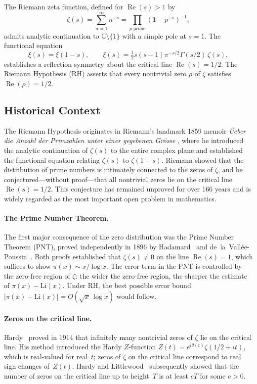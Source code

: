 \documentclass[11pt]{article}
\theoremstyle{remark}
\DeclareMathOperator{\Rea}{Re}
\begin{document}
The Riemann zeta function, defined for $\Rea(s)>1$ by
\begin{equation}\label{eq:zeta-def}
  \zeta(s) = \sum_{n=1}^{\infty} n^{-s} = \prod_{p\;\mathrm{prime}} (1-p^{-s})^{-1},
\end{equation}
admits analytic continuation to $\mathbb{C}\setminus\{1\}$ with a simple pole at $s=1$.
The functional equation
\begin{equation}\label{eq:func-eq}
  \xi(s) = \xi(1-s), \qquad \xi(s) = \tfrac{1}{2}s(s-1)\pi^{-s/2}\Gamma(s/2)\,\zeta(s),
\end{equation}
establishes a reflection symmetry about the critical line $\Rea(s)=1/2$.
The Riemann Hypothesis (RH) asserts that every nontrivial zero $\rho$ of $\zeta$
satisfies $\Rea(\rho)=1/2$.

\subsection{Historical Context}

The Riemann Hypothesis originates in Riemann's landmark 1859 memoir
\emph{\"Ueber die Anzahl der Primzahlen unter einer gegebenen Gr\"osse}
\cite{Riemann1859}, where he introduced the analytic continuation of $\zeta(s)$
to the entire complex plane and established the functional equation relating
$\zeta(s)$ to $\zeta(1-s)$.
Riemann showed that the distribution of prime numbers is intimately connected to the
zeros of $\zeta$, and he conjectured---without proof---that all nontrivial zeros
lie on the critical line $\Rea(s)=1/2$.
This conjecture has remained unproved for over 166 years and is widely regarded as
the most important open problem in mathematics.

\paragraph{The Prime Number Theorem.}
The first major consequence of the zero distribution was the Prime Number Theorem
(PNT), proved independently in 1896 by Hadamard~\cite{Hadamard} and
de~la~Vall\'ee-Poussin~\cite{dlVP}.
Both proofs established that $\zeta(s)\neq 0$ on the line $\Rea(s)=1$, which
suffices to show $\pi(x)\sim x/\log x$.
The error term in the PNT is controlled by the zero-free region of $\zeta$:
the wider the zero-free region, the sharper the estimate of $\pi(x)-\mathrm{Li}(x)$.
Under RH, the best possible error bound
$|\pi(x)-\mathrm{Li}(x)|=O(\sqrt{x}\,\log x)$ would follow.

\paragraph{Zeros on the critical line.}
Hardy~\cite{Hardy} proved in 1914 that infinitely many nontrivial zeros of
$\zeta$ lie on the critical line.
His method introduced the Hardy $Z$-function $Z(t)=e^{i\theta(t)}\zeta(1/2+it)$,
which is real-valued for real~$t$; zeros of $\zeta$ on the critical line
correspond to real sign changes of~$Z(t)$.
Hardy and Littlewood~\cite{HardyLittlewood} subsequently showed that the number
of zeros on the critical line up to height~$T$ is at least $cT$ for some $c>0$.
\end{document}
